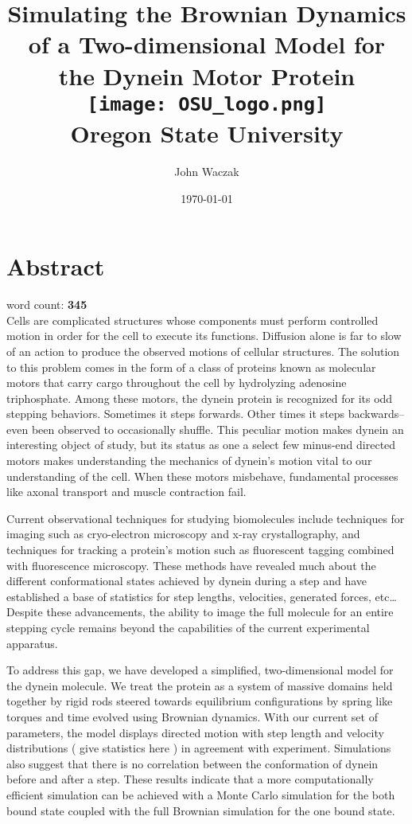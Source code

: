 \documentclass[12pt]{report}
\title{
	{Simulating the Brownian Dynamics of a Two-dimensional Model for the Dynein Motor Protein}\vspace{1.5em}\\
	\texttt{[image: OSU\_logo.png]}\vspace{0.5em}\\
	\large{Oregon State University}
}
\author{John Waczak}
\date{\today}
\begin{document}
	\onehalfspacing
	
	\maketitle
	
	\chapter*{Abstract}
	\vspace{-3 em}word count: \textbf{345}\\
	
	Cells are complicated structures whose components must perform controlled motion in order for the cell to execute its functions. Diffusion alone is far to slow of an action to produce the observed motions of cellular structures. The solution to this problem comes in the form of a class of proteins known as molecular motors that carry cargo throughout the cell by hydrolyzing adenosine triphosphate. Among these motors, the dynein protein is recognized for its odd stepping behaviors. Sometimes it steps forwards. Other times it steps backwards-- even been observed to occasionally shuffle. This peculiar motion makes dynein an interesting object of study, but its status as one a select few minus-end directed motors makes understanding the mechanics of dynein’s motion vital to our understanding of the cell. When these motors misbehave, fundamental processes like axonal transport and muscle contraction fail. 
	
	Current observational techniques for studying biomolecules include techniques for imaging such as cryo-electron microscopy and x-ray crystallography, and techniques for tracking a protein’s motion such as fluorescent tagging combined with fluorescence microscopy.  These methods have revealed much about the different conformational states achieved by dynein during a step and have established a base of statistics for step lengths, velocities, generated forces, etc… Despite these advancements, the ability to image the full molecule for an entire stepping cycle remains beyond the capabilities of the current experimental apparatus. 
	
	To address this gap, we have developed a simplified, two-dimensional model for the dynein molecule. We treat the protein as a system of massive domains held together by rigid rods steered towards equilibrium configurations by spring like torques and time evolved using Brownian dynamics. With our current set of parameters, the model displays directed motion with step length and velocity distributions ( give statistics here ) in agreement with experiment. Simulations also suggest that there is no correlation between the conformation of dynein before and after a step. These results indicate that a more computationally efficient simulation can be achieved with a Monte Carlo simulation for the both bound state coupled with the full Brownian simulation for the one bound state. 
	
\end{document}
